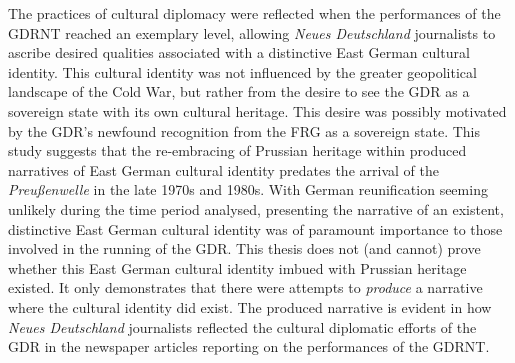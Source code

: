 The practices of cultural diplomacy were reflected when the performances of the GDRNT reached an exemplary level, allowing \textit{Neues Deutschland} journalists to ascribe desired qualities associated with a distinctive East German cultural identity. This cultural identity was not influenced by the greater geopolitical landscape of the Cold War, but rather from the desire to see the GDR as a sovereign state with its own cultural heritage. This desire was possibly motivated by the GDR’s newfound recognition from the FRG as a sovereign state. This study suggests that the re-embracing of Prussian heritage within produced narratives of East German cultural identity predates the arrival of the \textit{Preußenwelle} in the late 1970s and 1980s. With German reunification seeming unlikely during the time period analysed, presenting the narrative of an existent, distinctive East German cultural identity was of paramount importance to those involved in the running of the GDR. This thesis does not (and cannot) prove whether this East German cultural identity imbued with Prussian heritage existed. It only demonstrates that there were attempts to \textit{produce} a narrative where the cultural identity did exist. The produced narrative is evident in how \textit{Neues Deutschland} journalists reflected the cultural diplomatic efforts of the GDR in the newspaper articles reporting on the performances of the GDRNT. 